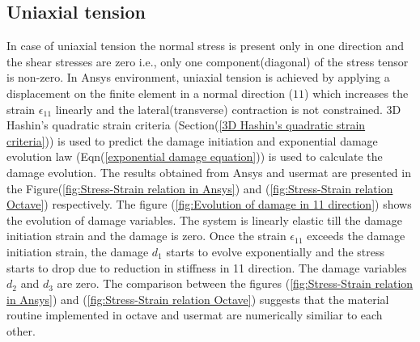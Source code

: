 \documentclass[a4paper,12pt,twoside]{report}
\begin{document}
\subsection{Uniaxial tension}
\indent\indent\indent In case of uniaxial tension the normal stress is present only in one direction and the shear stresses are zero i.e., only one component(diagonal) of the stress tensor is non-zero.  In Ansys environment, uniaxial tension is achieved by applying a displacement on the finite element in a normal direction ($11$) which increases the strain $\epsilon_{11}$ linearly and the lateral(transverse) contraction is not constrained. 3D Hashin's quadratic strain criteria (Section(\ref{3D Hashin's quadratic strain criteria})) is used to predict the damage initiation and exponential damage evolution law (Eqn(\ref{exponential damage equation})) is used to calculate the damage evolution. The results obtained from Ansys and usermat are presented in the Figure(\ref{fig:Stress-Strain relation in Ansys}) and (\ref{fig:Stress-Strain relation Octave}) respectively. The figure (\ref{fig:Evolution of damage in 11 direction}) shows the evolution of damage variables.  The system is linearly elastic till the damage initiation strain and the damage is zero. Once the strain $\epsilon_{11}$ exceeds the damage initiation strain, the damage $d_{1}$ starts to evolve exponentially and the stress starts to drop due to reduction in stiffness in 11 direction.  The damage variables $d_{2}$ and $d_{3}$ are zero. The comparison between the figures (\ref{fig:Stress-Strain relation in Ansys}) and (\ref{fig:Stress-Strain relation Octave}) suggests that the material routine implemented in octave and usermat are numerically similiar to each other.
\end{document}

